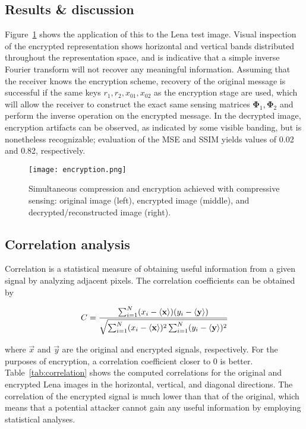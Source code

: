 \subsection{Results \& discussion}
\label{ssec:image-encrypt-rnd}
Figure~\ref{fig:encryption} shows the application of this to the Lena test image. Visual inspection of the encrypted representation shows horizontal and vertical bands distributed throughout the representation space, and is indicative that a simple inverse Fourier transform will not recover any meaningful information. Assuming that the receiver knows the encryption scheme, recovery of the original message is successful if the same keys $r_1, r_2, x_{01}, x_{02}$ as the encryption stage are used, which will allow the receiver to construct the exact same sensing matrices $\bm\Phi_1, \bm\Phi_2$ and perform the inverse operation on the encrypted message. In the decrypted image, encryption artifacts can be observed, as indicated by some visible banding, but is nonetheless recognizable; evaluation of the MSE and SSIM yields values of 0.02 and 0.82, respectively.

\begin{figure}[htb]
	\texttt{[image: encryption.png]}
	\caption{Simultaneous compression and encryption achieved with compressive sensing: original image (left), encrypted image (middle), and decrypted/reconstructed image (right).}
	\label{fig:encryption}
\end{figure}

\subsection{Correlation analysis}
\label{ssec:image-encrypt-correlation}
Correlation is a statistical measure of obtaining useful information from a given signal by analyzing adjacent pixels. The correlation coefficients can be obtained by

\begin{equation}
	\label{eq:correlation-coeff}
	C = \frac{\sum_{i=1}^N (x_i - \ev{\vec{x}}) (y_i - \ev{\vec{y}})}{\sqrt{\sum_{i=1}^N (x_i - \ev{\vec{x}})^2 \sum_{i=1}^N (y_i - \ev{\vec{y}})^2}}
\end{equation}

\noindent where $\vec{x}$ and $\vec{y}$ are the original and encrypted signals, respectively. For the purposes of encryption, a correlation coefficient closer to 0 is better. Table~\ref{tab:correlation} shows the computed correlations for the original and encrypted Lena images in the horizontal, vertical, and diagonal directions. The correlation of the encrypted signal is much lower than that of the original, which means that a potential attacker cannot gain any useful information by employing statistical analyses.

